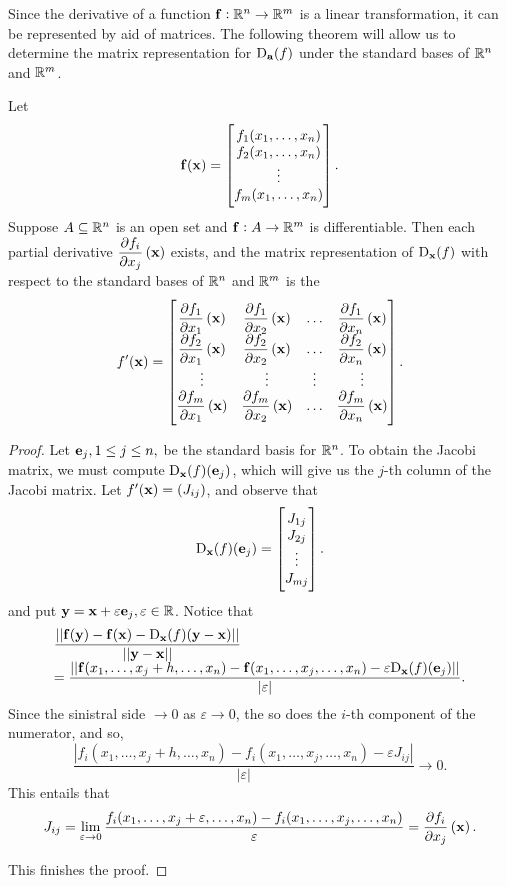 Since the derivative of a function $\funvect{f}:\reals^n \rightarrow \reals^m$
is a linear transformation, it can be represented by aid of
matrices. The following theorem will allow us to determine the
matrix representation for  $\deriv{a}{f}$  under the standard bases
of $\reals^n$ and $\reals^m$.
\begin{thm}
Let $$\funvect{f}(\point{x}) = \colvec{f_1(x_1,  \ldots, x_n) \\ f_2(x_1,  \ldots, x_n) \\ \vdots \\
f_m(x_1,  \ldots, x_n)}.$$Suppose $A\subseteq \reals^n$ is an
open set and $\funvect{f}:A \rightarrow \reals^m$ is differentiable. Then each
partial derivative $\partiald{j}{f_i}{x}$ exists, and the matrix
representation of $\deriv{x}{f}$ with respect to the standard bases
of $\reals^n$ and $\reals^m$ is the 
$$f'(\point{x}) = \begin{bmatrix}
\partiald{1}{f_1}{x} & \partiald{2}{f_1}{x}  & \dots & \partiald{n}{f_1}{x}  \cr
\partiald{1}{f_2}{x}  & \partiald{2}{f_2}{x} & \dots & \partiald{n}{f_2}{x} \cr \vdots & \vdots & \vdots & \vdots \cr
\partiald{1}{f_m}{x} & \partiald{2}{f_m}{x} & \dots & \partiald{n}{f_m}{x} \cr
\end{bmatrix}.$$
\end{thm}
\begin{proof}
Let $\vector{e}_j,  1 \leq j \leq n, $ be the standard basis for
$\reals^n$. To obtain the Jacobi matrix, we must compute
$\deriv{x}{f}(\vector{e}_j)$, which will give us the $j$-th column
of the Jacobi matrix. Let $f'(\point{x}) = (J_{ij})$, and observe
that
$$\deriv{x}{f}(\vector{e}_j) =
\begin{bmatrix} J_{1j} \cr J_{2j} \cr \vdots \cr J_{mj}   \end{bmatrix}.$$ and put $\point{y} = \point{x} +
\varepsilon\vector{e}_j, \varepsilon \in\reals$. Notice that
$${\everymath{\displaystyle}\begin{array}{l}\dfrac{||\funvect{f}(\point{y}) - \funvect{f}(\point{x}) - \deriv{x}{f}(\point{y} - \point{x})||}{||\point{y} -
\point{x}||}  \\  =
 \dfrac{||\funvect{f}(x_1,  \ldots , x_j + h, \ldots , x_n) - \funvect{f}(x_1,
 \ldots , x_j, \ldots , x_n) - \varepsilon
\deriv{x}{f}(\vector{e}_j)||}{|\varepsilon|}.\end{array}}$$Since
the sinistral side $\rightarrow 0$ as $\varepsilon \rightarrow 0$,
the so does the $i$-th component of the numerator, and so,
$$\dfrac{|f_i(x_1,  \ldots , x_j + h, \ldots , x_n) - f_i(x_1,
 \ldots , x_j, \ldots , x_n) - \varepsilon J_{ij}
|}{|\varepsilon|}\rightarrow 0.$$ This entails that
$$J_{ij} =  \lim _{\varepsilon \rightarrow 0} \dfrac{f_i(x_1,  \ldots, x_j + \varepsilon, \ldots, x_n)
- f_i(x_1,  \ldots, x_j, \ldots,  x_n)}{\varepsilon}     =
\partiald{j}{f_i}{x}.$$

This finishes the proof.
\end{proof}
